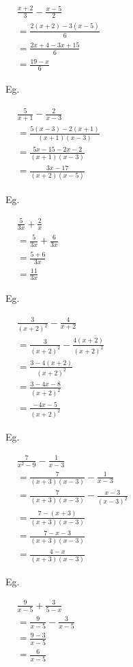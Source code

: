 \documentclass[twocolumn]{article}
\begin{document}
\noindent 
$
\begin{aligned}
	& \frac{x+2}{3}-\frac{x-5}{2} \\
	& =\frac{2(x+2)-3(x-5)}{6} \\
	& =\frac{2 x+4-3 x+15}{6} \\
	& =\frac{19-x}{6}
\end{aligned}
$

\noindent 
Eg.

\noindent 
$
\begin{aligned}
	& \frac{5}{x+1}-\frac{2}{x-3} \\
	& =\frac{5(x-3)-2(x+1)}{(x+1)(x-3)} \\
	& =\frac{5 x-15-2 x-2}{(x+1)(x-3)} \\
	& =\frac{3 x-17}{(x+2)(x-5)}
\end{aligned}
$

\noindent 
Eg.

\noindent 
$
\begin{aligned}
	& \frac{5}{3 x}+\frac{2}{x} \\
	& = \frac{5}{3 x}+\frac{6}{3x} \\
	& =\frac{5+6}{3 x} \\
	& =\frac{11}{3 x}
\end{aligned}
$

\noindent 
Eg. 

\noindent 
$
\begin{aligned}
	& \frac{3}{(x+2)^2}-\frac{4}{x+2} \\
	& =\frac{3}{(x+2)^2}-\frac{4(x+2)}{(x+2)^2} \\	
	& =\frac{3-4(x+2)}{(x+2)^2} \\
	& =\frac{3-4 x-8}{(x+2)^2} \\
	& =\frac{-4 x-5}{(x+2)^2}
\end{aligned}
$

\noindent 
Eg. 

\noindent 
$
\begin{aligned}
	& \frac{7}{x^2-9}-\frac{1}{x-3} \\
	& =\frac{7}{(x+3)(x-3)}-\frac{1}{x-3} \\
	& =\frac{7}{(x+3)(x-3)}-\frac{x-3}{(x-3)^2} \\	
	& =\frac{7-(x+3)}{(x+3)(x-3)} \\
	& =\frac{7-x-3}{(x+3)(x-3)} \\
	& =\frac{4-x}{(x+3)(x-3)}
\end{aligned}
$

\noindent 
Eg. 

\noindent 
$
\begin{aligned}
	& \frac{9}{x-5}+\frac{3}{5-x} \\
	& =\frac{9}{x-5}-\frac{3}{x-5} \\
	& =\frac{9-3}{x-5} \\
	& =\frac{6}{x-5}
\end{aligned}
$
\end{document}
